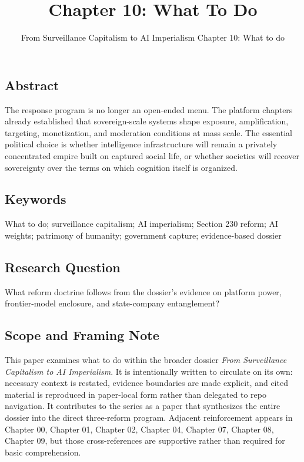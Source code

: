 \documentclass[
  american,
  11pt,
  letterpaper,
]{article}
\title{Chapter 10: What To Do}
\subtitle{From Surveillance Capitalism to AI Imperialism \textbar{}
Chapter 10: What to do}
\author{}
\date{}
\begin{document}
\maketitle

\subsection{Abstract}\label{abstract}

The response program is no longer an open-ended menu. The platform
chapters already established that sovereign-scale systems shape
exposure, amplification, targeting, monetization, and moderation
conditions at mass scale. The essential political choice is whether
intelligence infrastructure will remain a privately concentrated empire
built on captured social life, or whether societies will recover
sovereignty over the terms on which cognition itself is organized.

\subsection{Keywords}\label{keywords}

What to do; surveillance capitalism; AI imperialism; Section 230 reform;
AI weights; patrimony of humanity; government capture; evidence-based
dossier

\subsection{Research Question}\label{research-question}

What reform doctrine follows from the dossier's evidence on platform
power, frontier-model enclosure, and state-company entanglement?

\subsection{Scope and Framing Note}\label{scope-and-framing-note}

This paper examines what to do within the broader dossier \emph{From
Surveillance Capitalism to AI Imperialism}. It is intentionally written
to circulate on its own: necessary context is restated, evidence
boundaries are made explicit, and cited material is reproduced in
paper-local form rather than delegated to repo navigation. It
contributes to the series as a paper that synthesizes the entire dossier
into the direct three-reform program. Adjacent reinforcement appears in
Chapter 00, Chapter 01, Chapter 02, Chapter 04, Chapter 07, Chapter 08,
Chapter 09, but those cross-references are supportive rather than
required for basic comprehension.
\end{document}
